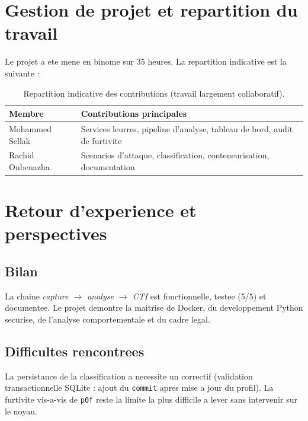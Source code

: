 \documentclass[11pt,a4paper]{article}
\begin{document}
\section{Gestion de projet et repartition du travail}
Le projet a ete mene en binome sur 35 heures. La repartition indicative est la suivante :

\begin{table}[h]\centering\small
\renewcommand{\arraystretch}{1.2}
\begin{tabular}{@{}ll@{}}
\toprule
\rowcolor{primary!8}\textbf{Membre} & \textbf{Contributions principales} \\
\midrule
Mohammed Sellak & Services leurres, pipeline d'analyse, tableau de bord, audit de furtivite \\
Rachid Oubenazha & Scenarios d'attaque, classification, conteneurisation, documentation \\
\bottomrule
\end{tabular}
\caption{Repartition indicative des contributions (travail largement collaboratif).}
\end{table}

\section{Retour d'experience et perspectives}
\subsection{Bilan}
La chaine \emph{capture $\rightarrow$ analyse $\rightarrow$ CTI} est fonctionnelle, testee
(5/5) et documentee. Le projet demontre la maitrise de Docker, du developpement Python
securise, de l'analyse comportementale et du cadre legal.

\subsection{Difficultes rencontrees}
La persistance de la classification a necessite un correctif (validation transactionnelle
SQLite : ajout du \texttt{commit} apres mise a jour du profil). La furtivite vis-a-vis de
\texttt{p0f} reste la limite la plus difficile a lever sans intervenir sur le noyau.
\end{document}
